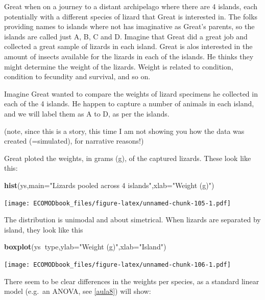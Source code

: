 \documentclass[
]{book}
\newenvironment{Shaded}{\begin{snugshade}}{\end{snugshade}}
\newcommand{\DataTypeTok}[1]{\textcolor[rgb]{0.13,0.29,0.53}{#1}}
\newcommand{\KeywordTok}[1]{\textcolor[rgb]{0.13,0.29,0.53}{\textbf{#1}}}
\newcommand{\NormalTok}[1]{#1}
\newcommand{\OperatorTok}[1]{\textcolor[rgb]{0.81,0.36,0.00}{\textbf{#1}}}
\newcommand{\StringTok}[1]{\textcolor[rgb]{0.31,0.60,0.02}{#1}}
\begin{document}
Great when on a journey to a distant archipelago where there are 4 islands, each potentially with a different species of lizard that Great is interested in. The folks providing names to islands where not has imaginative as Great's parents, so the islands are called just A, B, C and D. Imagine that Great did a great job and collected a great sample of lizards in each island. Great is alos interested in the amount of insects available for the lizards in each of the islands. He thinks they might determine the weight of the lizards. Weight is related to condition, condition to fecundity and survival, and so on.

Imagine Great wanted to compare the weights of lizard specimens he collected in each of the 4 islands. He happen to capture a number of animals in each island, and we will label them as A to D, as per the islands.

(note, since this is a story, this time I am not showing you how the data was created (=simulated), for narrative reasons!)

Great ploted the weights, in grams (g), of the captured lizards. These look like this:

\begin{Shaded}
\begin{Highlighting}[]
\KeywordTok{hist}\NormalTok{(ys,}\DataTypeTok{main=}\StringTok{"Lizards pooled across 4 islands"}\NormalTok{,}\DataTypeTok{xlab=}\StringTok{"Weight (g)"}\NormalTok{)}
\end{Highlighting}
\end{Shaded}

\texttt{[image: ECOMODbook\_files/figure-latex/unnamed-chunk-105-1.pdf]}

The distribution is unimodal and about simetrical. When lizards are separated by island, they look like this

\begin{Shaded}
\begin{Highlighting}[]
\KeywordTok{boxplot}\NormalTok{(ys}\OperatorTok{~}\NormalTok{type,}\DataTypeTok{ylab=}\StringTok{"Weight (g)"}\NormalTok{,}\DataTypeTok{xlab=}\StringTok{"Island"}\NormalTok{)}
\end{Highlighting}
\end{Shaded}

\texttt{[image: ECOMODbook\_files/figure-latex/unnamed-chunk-106-1.pdf]}

There seem to be clear differences in the weights per species, as a standard linear model (e.g.~an ANOVA, see \ref{aula8}) will show:
\end{document}
